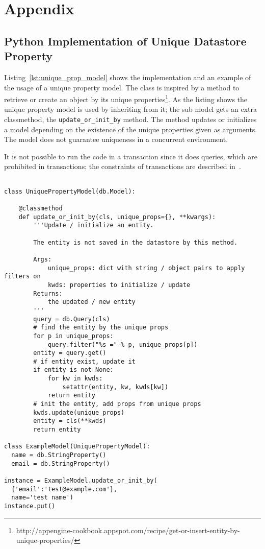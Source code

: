 \chapter{Appendix}
\label{app:ws_imp}

\section{Python Implementation of Unique Datastore Property}
Listing~\ref{lst:unique_prop_model} shows the implementation and an example of
the usage of a unique property model. The class is inspired by a method to
retrieve or create an object by its unique
properties\footnote{http://appengine-cookbook.appspot.com/recipe/get-or-insert-entity-by-unique-properties/}.
As the listing shows the unique property model is used by inheriting from it; the
sub model gets an extra classmethod, the \verb|update_or_init_by| method. The
method updates or initializes a model depending on the existence of the unique
properties given as arguments. The model does not guarantee uniqueness in a
concurrent environment.

It is not possible to run the code in a transaction since it does queries, which
are prohibited in transactions; the constraints of transactions are described
in~\cite{Google:transactions}. 

\begin{lstlisting}[label=lst:unique_prop_model,caption=Unique property model]
  
class UniquePropertyModel(db.Model):
    
    @classmethod
    def update_or_init_by(cls, unique_props={}, **kwargs):
        '''Update / initialize an entity.
                
        The entity is not saved in the datastore by this method.
        
        Args:
            unique_props: dict with string / object pairs to apply filters on
            kwds: properties to initialize / update
        Returns:
            the updated / new entity
        '''
        query = db.Query(cls)
        # find the entity by the unique props
        for p in unique_props:
            query.filter("%s =" % p, unique_props[p])
        entity = query.get()
        # if entity exist, update it
        if entity is not None:
            for kw in kwds:
                setattr(entity, kw, kwds[kw])
            return entity
        # init the entity, add props from unique props
        kwds.update(unique_props)
        entity = cls(**kwds)
        return entity

class ExampleModel(UniquePropertyModel):
  name = db.StringProperty()
  email = db.StringProperty()

instance = ExampleModel.update_or_init_by(
  {'email':'test@example.com'}, 
  name='test name')
instance.put()
\end{lstlisting}     
        

